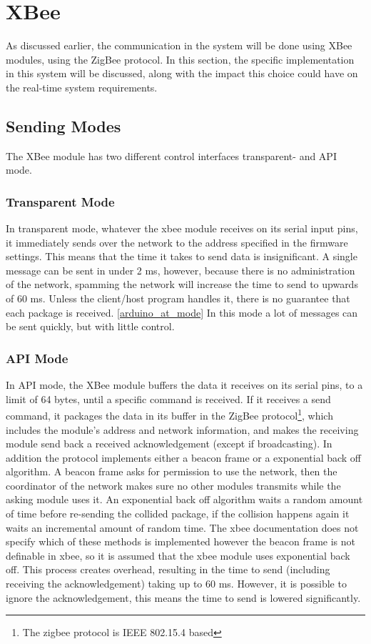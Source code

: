 \section{XBee}
As discussed earlier, the communication in the system will be done using XBee modules, using the ZigBee protocol. In this section, the specific implementation in this system will be discussed, along with the impact this choice could have on the real-time system requirements.

\subsection{Sending Modes}
The XBee module has two different control interfaces transparent- and API mode.
\subsubsection{Transparent Mode}
In transparent mode, whatever the xbee module receives on its serial input pins, it immediately sends over the network to the address specified in the firmware settings. This means that the time it takes to send data is insignificant.  A single message can be sent in under 2 ms, however, because there is no administration of the network, spamming the network will increase the time to send to upwards of 60 ms. Unless the client/host program handles it, there is no guarantee that each package is received. \cref{arduino_at_mode}
In this mode a lot of messages can be sent quickly, but with little control.
\subsubsection{API Mode}
In API mode, the XBee module buffers the data it receives on its serial pins, to a limit of 64 bytes, until a specific command is received. If it receives a send command, it packages the data in its buffer in the ZigBee protocol\footnote{The zigbee protocol is IEEE 802.15.4 based}, which includes the module's address and network information, and makes the receiving module send back a received acknowledgement (except if broadcasting). In addition the protocol implements either a beacon frame or a exponential back off algorithm. A beacon frame asks for permission to use the network, then the coordinator of the network makes sure no other modules transmits while the asking module uses it. An exponential back off algorithm waits a random amount of time before re-sending the collided package, if the collision happens again it waits an incremental amount of random time. The xbee documentation does not specify which of these methods is implemented however the beacon frame is not definable in xbee, so it is assumed that the xbee module uses exponential back off. This process creates overhead, resulting in the time to send (including receiving the acknowledgement) taking up to 60 ms. However, it is possible to ignore the acknowledgement, this means the time to send is lowered significantly.
